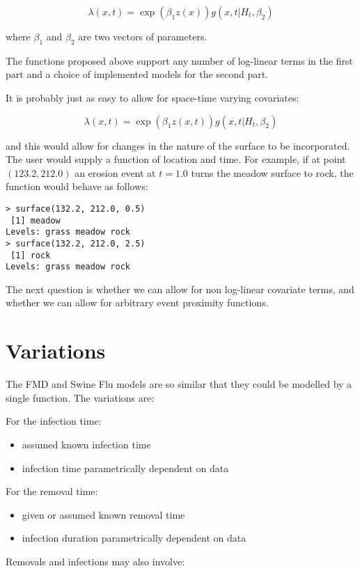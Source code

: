 \documentclass{article}
\begin{document}
$$
\lambda(x,t) = \exp(\beta_1 z(x)) g(x,t|H_t,\beta_2)
$$

where $\beta_1$ and $\beta_2$ are two vectors of parameters.

The functions proposed above support any number of log-linear terms in the first part and a choice of implemented models for the second part.

It is probably just as easy to allow for space-time varying covariates:

$$
\lambda(x,t) = \exp(\beta_1 z(x,t)) g(x,t|H_t,\beta_2)
$$

and this would allow for changes in the nature of the surface to be incorporated. The user would supply
a function of location and time. For example, if at point $(123.2,212.0)$ an erosion event at $t=1.0$ turns the
meadow surface to rock, the function would behave as follows:

\begin{verbatim}
> surface(132.2, 212.0, 0.5)
 [1] meadow 
Levels: grass meadow rock
> surface(132.2, 212.0, 2.5)
 [1] rock 
Levels: grass meadow rock
\end{verbatim}

The next question is whether we can allow for non log-linear covariate terms, and whether we can allow for 
arbitrary event proximity functions.


\section*{Variations}

The FMD and Swine Flu models are so similar that they could be modelled by a single function. The variations are:

For the infection time:

\begin{itemize}
\item assumed known infection time
\item infection time parametrically dependent on data
\end{itemize}

For the removal time:

\begin{itemize}
\item given or assumed known removal time 
\item infection duration parametrically dependent on data
\end{itemize}

Removals and infections may also involve:
\end{document}

